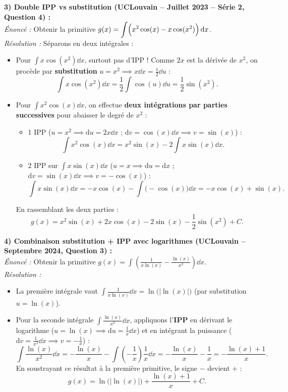 \begin{exemple}
\medskip
\textbf{3) Double IPP vs substitution (UCLouvain -- Juillet 2023 -- Série 2, Question 4) :}\\
\emph{Énoncé :} Obtenir la primitive $g(x) = \displaystyle\int \Bigl(x^2\cos(x) - x\cos(x^2)\Bigr)\,\mathrm{d} x$.\\
\emph{Résolution :} Séparons en deux intégrales :
\begin{itemize}
    \item Pour $\displaystyle\int x\cos(x^2)\dd x$, surtout pas d'IPP ! Comme $2x$ est la dérivée de $x^2$, on procède par \textbf{substitution} $u = x^2 \implies x\dd x = \frac{1}{2}\dd u$ :
    \[
        \int x\cos(x^2)\dd x = \frac{1}{2}\int \cos(u)\dd u = \frac{1}{2}\sin(x^2).
    \]
    \item Pour $\displaystyle\int x^2\cos(x)\dd x$, on effectue \textbf{deux intégrations par parties successives} pour abaisser le degré de $x^2$ :
    \begin{itemize}
        \item 1\iere{} IPP ($u = x^2 \implies \mathrm{d}u = 2x\dd x$ ; $\mathrm{d}v = \cos(x)\dd x \implies v = \sin(x)$) :
        \[
            \int x^2\cos(x)\dd x = x^2\sin(x) - 2\int x\sin(x)\dd x.
        \]
        \item 2\ieme{} IPP sur $\int x\sin(x)\dd x$ ($u = x \implies \mathrm{d}u = \mathrm{d}x$ ; $\mathrm{d}v = \sin(x)\dd x \implies v = -\cos(x)$) :
        \[
            \int x\sin(x)\dd x = -x\cos(x) - \int \bigl(-\cos(x)\bigr)\dd x = -x\cos(x) + \sin(x).
        \]
    \end{itemize}
    En rassemblant les deux parties :
    \[
        \boxed{g(x) = x^2\sin(x) + 2x\cos(x) - 2\sin(x) - \frac{1}{2}\sin(x^2) + C}.
    \]
\end{itemize}

\medskip
\textbf{4) Combinaison substitution + IPP avec logarithmes (UCLouvain -- Septembre 2024, Question 3) :}\\
\emph{Énoncé :} Obtenir la primitive $g(x) = \displaystyle\int \left(\frac{1}{x\ln(x)} - \frac{\ln(x)}{x^2}\right)\dd x$.\\
\emph{Résolution :}
\begin{itemize}
    \item La première intégrale vaut $\displaystyle\int \frac{1}{x\ln(x)}\dd x = \ln\bigl(|\ln(x)|\bigr)$ (par substitution $u = \ln(x)$).
    \item Pour la seconde intégrale $\displaystyle\int \frac{\ln(x)}{x^2}\dd x$, appliquons l'\textbf{IPP} en dérivant le logarithme ($u = \ln(x) \implies \mathrm{d}u = \frac{1}{x}\dd x$) et en intégrant la puissance ($\mathrm{d}v = \frac{1}{x^2}\dd x \implies v = -\frac{1}{x}$) :
    \[
        \int \frac{\ln(x)}{x^2}\dd x = -\frac{\ln(x)}{x} - \int \left(-\frac{1}{x}\right)\frac{1}{x}\dd x = -\frac{\ln(x)}{x} - \frac{1}{x} = -\frac{\ln(x) + 1}{x}.
    \]
    En soustrayant ce résultat à la première primitive, le signe $-$ devient $+$ :
    \[
        \boxed{g(x) = \ln\bigl(|\ln(x)|\bigr) + \frac{\ln(x) + 1}{x} + C}.
    \]
\end{itemize}


\end{exemple}
